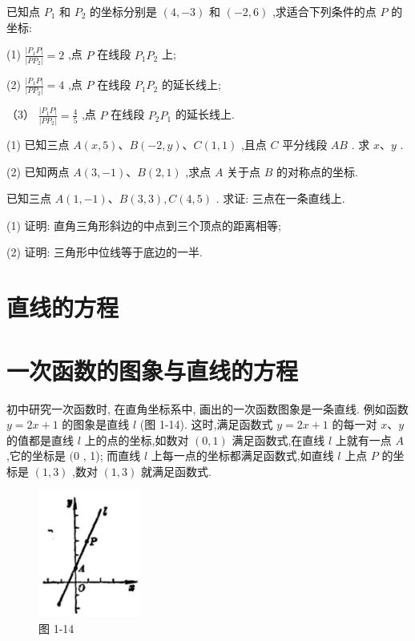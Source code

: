 \documentclass[lang=cn,newtx,10pt,scheme=chinese]{elegantbook}
\begin{document}
\begin{problemset}[习 题 一]
\item 已知点 \({P}_{1}\) 和 \({P}_{2}\) 的坐标分别是 \(\left( {4, - 3}\right)\) 和 \(\left( {-2,6}\right)\) ,求适合下列条件的点 \(P\) 的坐标:

(1) \(\frac{\left| {P}_{1}P\right| }{\left| P{P}_{2}\right| } = 2\) ,点 \(P\) 在线段 \({P}_{1}{P}_{2}\) 上;

(2) \(\frac{\left| {P}_{1}P\right| }{\left| P{P}_{2}\right| } = 4\) ,点 \(P\) 在线段 \({P}_{1}{P}_{2}\) 的延长线上;

（3） \(\frac{\left| {P}_{1}P\right| }{\left| P{P}_{2}\right| } = \frac{4}{5}\) ,点 \(P\) 在线段 \({P}_{2}{P}_{1}\) 的延长线上.

\item (1) 已知三点 \(A\left( {x,5}\right) \text{、}B\left( {-2,y}\right) \text{、}C\left( {1,1}\right)\) ,且点 \(C\) 平分线段 \({AB}\) . 求 \(x\text{、}y\) .

(2) 已知两点 \(A\left( {3, - 1}\right) \text{、}B\left( {2,1}\right)\) ,求点 \(A\) 关于点 \(B\) 的对称点的坐标.

\item 已知三点 \(A\left( {1, - 1}\right) \text{、}B\left( {3,3}\right) ,C\left( {4,5}\right)\) . 求证: 三点在一条直线上.

\item (1) 证明: 直角三角形斜边的中点到三个顶点的距离相等;

(2) 证明: 三角形中位线等于底边的一半.
\end{problemset}

\section*{直线的方程}

\section{一次函数的图象与直线的方程}

初中研究一次函数时, 在直角坐标系中, 画出的一次函数图象是一条直线. 例如函数 \(y = {2x} + 1\) 的图象是直线 \(l\) (图 1-14). 这时,满足函数式 \(y = {2x} + 1\) 的每一对 \(x\text{、}y\) 的值都是直线 \(l\) 上的点的坐标,如数对 \(\left( {0,1}\right)\) 满足函数式,在直线 \(l\) 上就有一点 \(A\) ,它的坐标是 \((0\) , 1); 而直线 \(l\) 上每一点的坐标都满足函数式,如直线 \(l\) 上点 \(P\) 的坐标是 \(\left( {1,3}\right)\) ,数对 \(\left( {1,3}\right)\) 就满足函数式.

\begin{figure}[h]
  \centering
  \includegraphics[max width=0.3\textwidth]{images/01912cc2-ffb6-728e-9ae7-b113ff05c64b_18_311691.jpg}
  \caption{图 1-14}
\end{figure}
\end{document}
